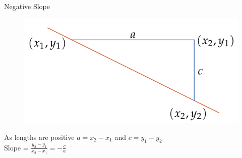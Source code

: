 \documentclass{beamer}
\begin{document}
  \begin{frame}{Negative Slope}
    \begin{figure}
      \centering
      \includegraphics[scale=0.3]{negative-slope.png}
    \end{figure}
    As lengths are positive \(a = x_{2} - x_{1}\) and \(c = y_{1} - y_{2} \)  \\
    \bigskip
    Slope  = \(\frac{y_{2} - y_{1}}{x_{2} - x_{1}} = -\frac{c}{a} \) 
  \end{frame}
\end{document}
